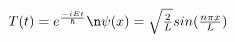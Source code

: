 \documentclass[preview]{standalone}
\begin{document}
\begin{center}
$T(t) = e^{\frac{-iEt}{\hbar}} \n \psi(x) = \sqrt{\frac{2}{L}}sin(\frac{n\pi x}{L})$
\end{center}
\end{document}
